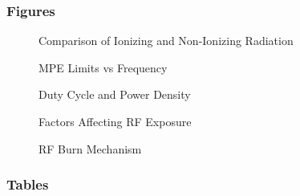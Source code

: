 \subsubsection*{Figures}

\begin{figure}[h]
    \centering
    \caption{Comparison of Ionizing and Non-Ionizing Radiation}
    \label{fig:radiation-comparison}
\end{figure}

\begin{figure}[h]
    \centering
    \caption{MPE Limits vs Frequency}
    \label{fig:mpe-frequency}
\end{figure}

\begin{figure}[h]
    \centering
    \caption{Duty Cycle and Power Density}
    \label{fig:duty-cycle-power-density}
\end{figure}

\begin{figure}[h]
    \centering
    \caption{Factors Affecting RF Exposure}
    \label{fig:rf-exposure-factors}
\end{figure}

\begin{figure}[h]
    \centering
    \caption{RF Burn Mechanism}
    \label{fig:rf-burn-mechanism}
\end{figure}

\subsubsection*{Tables}

